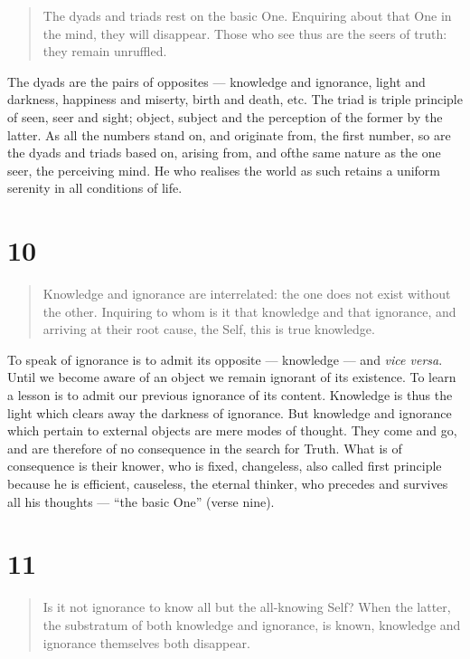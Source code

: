 \documentclass[12pt]{report}
\begin{document}
\begin{quote}
The dyads and triads rest on the basic One. Enquiring about that One
in the mind, they will disappear. Those who see thus are the seers of
truth: they remain unruffled.
\end{quote}


The dyads are the pairs of opposites --- knowledge and ignorance,
light and darkness, happiness and miserty, birth and death, etc. The
triad is triple principle of seen, seer and sight; object, subject and
the perception of the former by the latter. As all the numbers stand
on, and originate from, the first number, so are the dyads and triads
based on, arising from, and ofthe same nature as the one seer, the
perceiving mind. He who realises the world as such retains a uniform
serenity in all conditions of life.


\section*{10}

\begin{quote}
Knowledge and ignorance are interrelated: the one does not exist
without the other. Inquiring to whom is it that knowledge and that
ignorance, and arriving at their root cause, the Self, this is true
knowledge. 
\end{quote}


To speak of ignorance is to admit its opposite --- knowledge --- and
\emph{vice versa}. Until we become aware of an object we remain
ignorant of its existence. To learn a lesson is to admit our previous
ignorance of its content. Knowledge is thus the light which clears
away the darkness of ignorance. But knowledge and ignorance which
pertain to external objects are mere modes of thought. They come and
go, and are therefore of no consequence in the search for Truth. What
is of consequence is their knower, who is fixed, changeless, also
called first principle because he is efficient, causeless, the eternal
thinker, who precedes and survives all his thoughts --- ``the basic
One'' (verse nine).

\section*{11}

\begin{quote}
Is it not ignorance to know all but the all-knowing Self? When the
latter, the substratum of both knowledge and ignorance, is known,
knowledge and ignorance themselves both disappear.
\end{quote}
\end{document}

